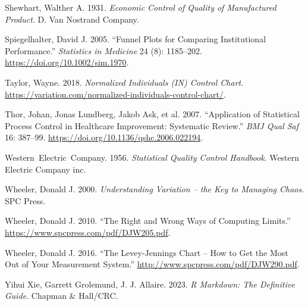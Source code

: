 \documentclass[
]{book}
\newlength{\cslhangindent}
\newenvironment{CSLReferences}[2] %
 {\begin{list}{}{%
  \setlength{\itemindent}{0pt}
  \setlength{\leftmargin}{0pt}
  \setlength{\parsep}{0pt}
  \ifodd #1
   \setlength{\leftmargin}{\cslhangindent}
   \setlength{\itemindent}{-1\cslhangindent}
  \fi
  \setlength{\itemsep}{#2\baselineskip}}}
 {\end{list}}
\begin{document}
\begin{CSLReferences}{1}{1}
Shewhart, Walther A. 1931. \emph{Economic Control of Quality of Manufactured Product}. D. Van Nostrand Company.

Spiegelhalter, David J. 2005. {``Funnel Plots for Comparing Institutional Performance.''} \emph{Statistics in Medicine} 24 (8): 1185--202. \url{https://doi.org/10.1002/sim.1970}.

Taylor, Wayne. 2018. \emph{Normalized Individuals (IN) Control Chart}. \url{https://variation.com/normalized-individuals-control-chart/}.

Thor, Johan, Jonas Lundberg, Jakob Ask, et al. 2007. {``Application of Statistical Process Control in Healthcare Improvement: Systematic Review.''} \emph{BMJ Qual Saf} 16: 387--99. \url{https://doi.org/10.1136/qshc.2006.022194}.

Western~Electric~Company. 1956. \emph{Statistical Quality Control Handbook}. Western Electric Company inc.

Wheeler, Donald J. 2000. \emph{Understanding Variation -- the Key to Managing Chaos}. SPC Press.

Wheeler, Donald J. 2010. {``The Right and Wrong Ways of Computing Limits.''} \url{https://www.spcpress.com/pdf/DJW205.pdf}.

Wheeler, Donald J. 2016. {``The Levey-Jennings Chart -- How to Get the Most Out of Your Measurement System.''} \url{http://www.spcpress.com/pdf/DJW290.pdf}.

Yihui Xie, Garrett Grolemund, J. J. Allaire. 2023. \emph{R Markdown: The Definitive Guide}. Chapman \& Hall/CRC.

\end{CSLReferences}
\end{document}
